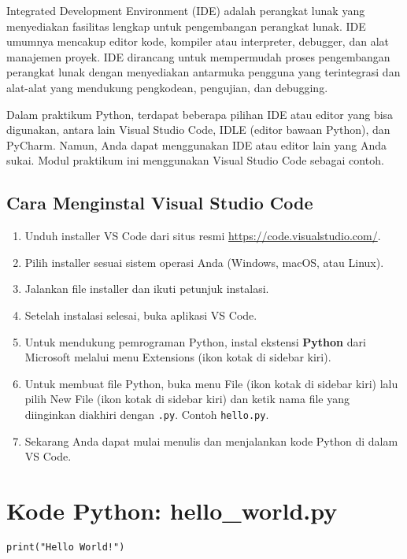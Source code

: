 Integrated Development Environment (IDE) adalah perangkat lunak yang menyediakan fasilitas lengkap untuk pengembangan perangkat lunak. IDE umumnya mencakup editor kode, kompiler atau interpreter, debugger, dan alat manajemen proyek. IDE dirancang untuk mempermudah proses pengembangan perangkat lunak dengan menyediakan antarmuka pengguna yang terintegrasi dan alat-alat yang mendukung pengkodean, pengujian, dan debugging.

Dalam praktikum Python, terdapat beberapa pilihan IDE atau editor yang bisa digunakan, antara lain Visual Studio Code, IDLE (editor bawaan Python), dan PyCharm. Namun, Anda dapat menggunakan IDE atau editor lain yang Anda sukai. Modul praktikum ini menggunakan Visual Studio Code sebagai contoh.

\subsection{Cara Menginstal Visual Studio Code}

\begin{enumerate}
    \item Unduh installer VS Code dari situs resmi \url{https://code.visualstudio.com/}.
    \item Pilih installer sesuai sistem operasi Anda (Windows, macOS, atau Linux).
    \item Jalankan file installer dan ikuti petunjuk instalasi.
    \item Setelah instalasi selesai, buka aplikasi VS Code.
    \item Untuk mendukung pemrograman Python, instal ekstensi \textbf{Python} dari Microsoft melalui menu Extensions (ikon kotak di sidebar kiri).
    \item Untuk membuat file Python, buka menu File (ikon kotak di sidebar kiri) lalu pilih New File (ikon kotak di sidebar kiri) dan ketik nama file yang diinginkan diakhiri dengan \texttt{.py}. Contoh \texttt{hello.py}.
    \item Sekarang Anda dapat mulai menulis dan menjalankan kode Python di dalam VS Code.
\end{enumerate}

\section{Kode Python: hello_world.py}\label{sec:hello_world_code}

\begin{lstlisting}[style=PythonStyle, caption={Kode Python: hello_world.py}]
print("Hello World!")
\end{lstlisting}

